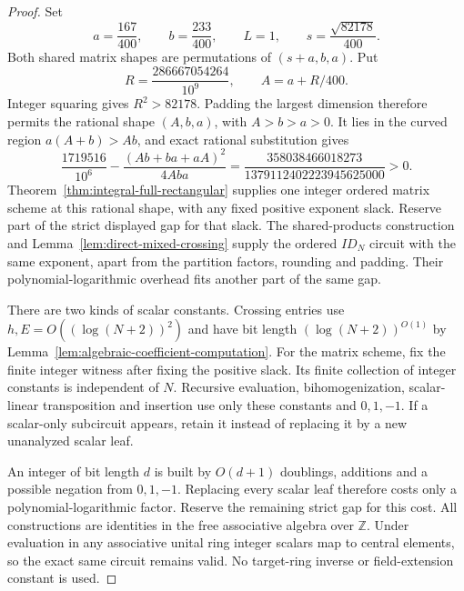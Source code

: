 \begin{proof}
Set
\[
 a=\frac{167}{400},\qquad b=\frac{233}{400},\qquad L=1,
 \qquad s=\frac{\sqrt{82178}}{400}.
\]
Both shared matrix shapes are permutations of $(s+a,b,a)$. Put
\[
 R=\frac{286667054264}{10^9},\qquad A=a+R/400.
\]
Integer squaring gives $R^2>82178$. Padding the largest dimension
therefore permits the rational shape $(A,b,a)$, with $A>b>a>0$.
It lies in the curved region $a(A+b)>Ab$, and exact rational
substitution gives
\[
 \frac{1719516}{10^6}
 -\frac{(Ab+ba+aA)^2}{4Aba}
 =\frac{358038466018273}{1379112402223945625000}>0.
\]
Theorem~\ref{thm:integral-full-rectangular} supplies one integer
ordered matrix scheme at this rational shape, with any fixed
positive exponent slack. Reserve part of the strict displayed gap
for that slack. The shared-products construction and
Lemma~\ref{lem:direct-mixed-crossing} supply the ordered $ID_N$
circuit with the same exponent, apart from the partition factors,
rounding and padding. Their polynomial-logarithmic overhead fits
another part of the same gap.

There are two kinds of scalar constants. Crossing entries use
$h,E=O((\log(N+2))^2)$ and have bit length
$(\log(N+2))^{O(1)}$ by
Lemma~\ref{lem:algebraic-coefficient-computation}. For the matrix
scheme, fix the finite integer witness after fixing the positive
slack. Its finite collection of integer constants is independent of
$N$. Recursive evaluation, bihomogenization, scalar-linear
transposition and insertion use only these constants and $0,1,-1$.
If a scalar-only subcircuit appears, retain it instead of replacing
it by a new unanalyzed scalar leaf.

An integer of bit length $d$ is built by $O(d+1)$ doublings, additions
and a possible negation from $0,1,-1$. Replacing every scalar leaf
therefore costs only a polynomial-logarithmic factor. Reserve the
remaining strict gap for this cost. All constructions are identities
in the free associative algebra over $\mathbb Z$. Under evaluation in
any associative unital ring integer scalars map to central elements,
so the exact same circuit remains valid. No target-ring inverse or
field-extension constant is used.
\end{proof}

